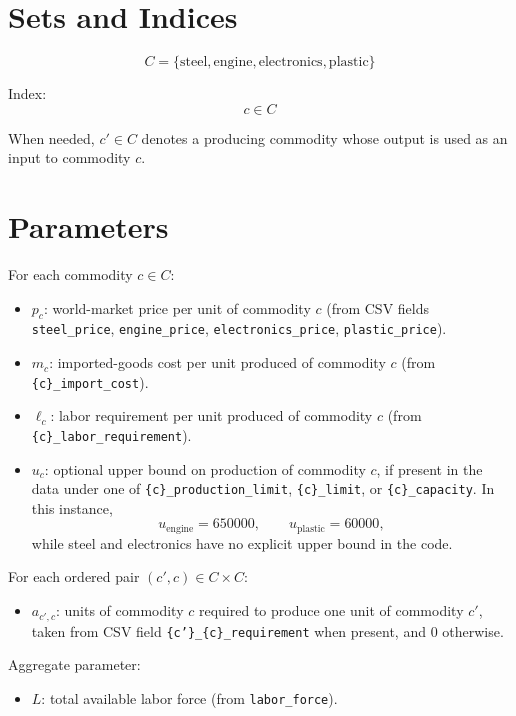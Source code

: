 \section*{Sets and Indices}

\[
C = \{\text{steel},\text{engine},\text{electronics},\text{plastic}\}
\]

Index:
\[
c \in C
\]

When needed, \(c' \in C\) denotes a producing commodity whose output is used as an input to commodity \(c\).

\section*{Parameters}

For each commodity \(c \in C\):

\begin{itemize}
\item \(p_c\): world-market price per unit of commodity \(c\) (from CSV fields \texttt{steel\_price}, \texttt{engine\_price}, \texttt{electronics\_price}, \texttt{plastic\_price}).
\item \(m_c\): imported-goods cost per unit produced of commodity \(c\) (from \texttt{\{c\}\_import\_cost}).
\item \(\ell_c\): labor requirement per unit produced of commodity \(c\) (from \texttt{\{c\}\_labor\_requirement}).
\item \(u_c\): optional upper bound on production of commodity \(c\), if present in the data under one of
\texttt{\{c\}\_production\_limit}, \texttt{\{c\}\_limit}, or \texttt{\{c\}\_capacity}.
In this instance,
\[
u_{\text{engine}} = 650000,\qquad
u_{\text{plastic}} = 60000,
\]
while steel and electronics have no explicit upper bound in the code.
\end{itemize}

For each ordered pair \((c',c) \in C \times C\):

\begin{itemize}
\item \(a_{c',c}\): units of commodity \(c\) required to produce one unit of commodity \(c'\), taken from CSV field \texttt{\{c'\}\_\{c\}\_requirement} when present, and \(0\) otherwise.
\end{itemize}

Aggregate parameter:

\begin{itemize}
\item \(L\): total available labor force (from \texttt{labor\_force}).
\end{itemize}

